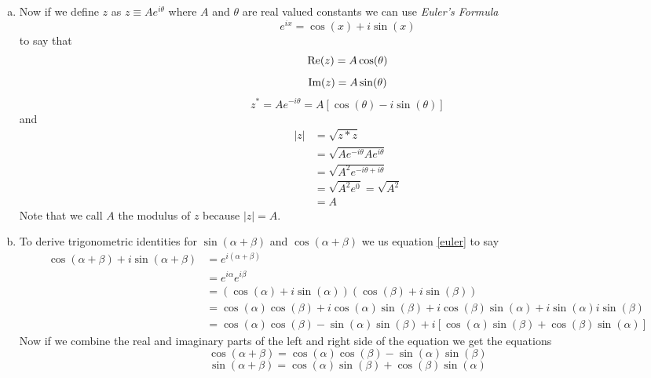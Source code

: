 \documentclass[11pt]{article}
\numberwithin{equation}{section}
\newcommand{\Img}{\textnormal{Im}}
\newcommand{\Real}{\textnormal{Re}}
\begin{document}
\begin{enumerate}[(a)]
\item
Now if we define $z$ as $z\equiv Ae^{i\theta}$ where $A$ and $\theta$ are real valued constants we can use \emph{Euler's Formula}
\begin{equation}
e^{ix} = \cos(x)+i\sin(x)
\label{euler}
\end{equation}
to say that
$$\Real(z) = A\cos(\theta)$$
$$\Img(z) = A\sin(\theta)$$
$$z^{*} = Ae^{-i\theta} = A\left[\cos(\theta)-i\sin(\theta)\right]$$
and
\begin{align*}
|z| &= \sqrt{z*z}\\
&= \sqrt{Ae^{-i\theta}Ae^{i\theta}}\\
&= \sqrt{A^2e^{-i\theta+i\theta}}\\
&= \sqrt{A^2e^0} = \sqrt{A^2}\\
&= A
\end{align*}
Note that we call $A$ the modulus of $z$ because $|z| = A$.

\item
To derive trigonometric identities for $\sin(\alpha+\beta)$ and $\cos(\alpha+\beta)$ we us equation \ref{euler} to say
\begin{align*}
\cos{(\alpha+\beta)}+i\sin{(\alpha+\beta)} &= e^{i(\alpha+\beta)}\\
&= e^{i\alpha}e^{i\beta}\\
&= \left(\cos(\alpha)+i\sin(\alpha)\right)\left(\cos(\beta)+i\sin(\beta)\right)\\
&= \cos(\alpha)\cos(\beta)+i\cos(\alpha)\sin(\beta)+i\cos(\beta)\sin(\alpha) +i\sin(\alpha) i\sin(\beta) \\
&= \cos(\alpha)\cos(\beta)-\sin(\alpha) \sin(\beta)+i\left[\cos(\alpha)\sin(\beta)+\cos(\beta)\sin(\alpha)\right] 
\end{align*}
Now if we combine the real and imaginary parts of the left and right side of the equation we get the equations
$$\cos{(\alpha+\beta)} = \cos(\alpha)\cos(\beta)-\sin(\alpha)\sin(\beta)$$
$$\sin{(\alpha+\beta)} = \cos(\alpha)\sin(\beta)+\cos(\beta)\sin(\alpha)$$


\end{enumerate}
\end{document}
